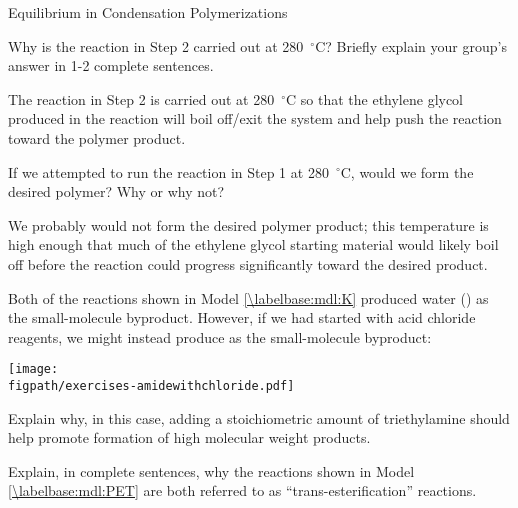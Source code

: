 \begin{activity}{Equilibrium in Condensation Polymerizations}
\begin{ctqs}
	\question Why is the reaction in Step 2 carried out at 280~${}^\circ$C?  Briefly explain your group's answer in 1-2 complete sentences.
	
		\begin{solution}[1.25in]
			The reaction in Step 2 is carried out at 280~${}^\circ$C so that the ethylene glycol produced in the reaction will boil off/exit the system and help push the reaction toward the polymer product.
		\end{solution}
	
	\question If we attempted to run the reaction in Step 1 at 280~${}^\circ$C, would we form the desired polymer? Why or why not?
	
		\begin{solution}[1.25in]
			We probably would not form the desired polymer product; this temperature is high enough that much of the ethylene glycol starting material would likely boil off before the reaction could progress significantly toward the desired product.
		\end{solution}
		
\end{ctqs}
	


\begin{exercises}

		\exercise Both of the reactions shown in Model \ref{\labelbase:mdl:K} produced water () as the small-molecule byproduct.  However, if we had started with acid chloride reagents, we might instead produce  as the small-molecule byproduct:
		
		\centerline{\texttt{[image: \\figpath/exercises-amidewithchloride.pdf]}}
		
		Explain why, in this case, adding a stoichiometric amount of triethylamine should help promote formation of high molecular weight products.
		
			\begin{solution}
			\end{solution}
			
		\exercise Explain, in complete sentences, why the reactions shown in Model \ref{\labelbase:mdl:PET} are both referred to as ``trans-esterification'' reactions.
		

\end{exercises}
\end{activity}
